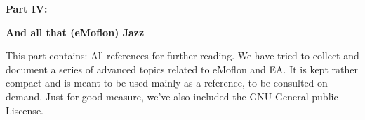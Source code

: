\vspace*{2cm}

{\bf \huge Part IV:}
\vspace{1cm}

{\bf \Huge And all that (eMoflon) Jazz}
\vspace{1cm}

This part contains: All references for further reading. We have tried to collect and document a series of advanced topics related to eMoflon and EA. It is kept
rather compact and is meant to be used mainly as a reference, to be consulted on demand. Just for good measure, we've also included the GNU General public
Liscense.
















